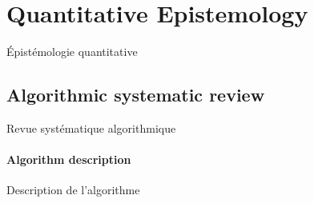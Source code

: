 






\section{Quantitative Epistemology}{Épistémologie quantitative}

\label{app:sec:quantepistemo}



\subsection{Algorithmic systematic review}{Revue systématique algorithmique}



\paragraph{Algorithm description}{Description de l'algorithme}



